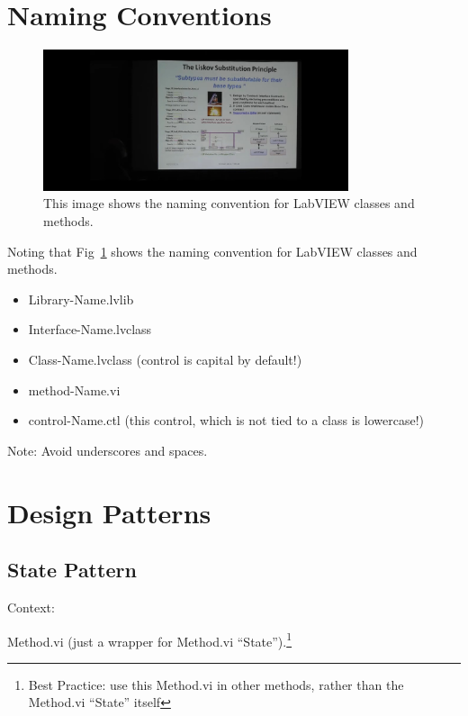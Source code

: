 \documentclass{article}
\begin{document}
\section{Naming Conventions}
\label{sec:naming-conventions}

\begin{figure}[!ht]
    \centering
    \includegraphics[width=0.8\textwidth]{figures/dmitry_liskov_sub_principle}
    \caption{This image shows the naming convention for LabVIEW classes and methods.}
    \label{fig:dmitry-liskov-sub-principle}
\end{figure}

Noting that Fig~\ref{fig:dmitry-liskov-sub-principle} shows the naming convention for LabVIEW classes and methods.
\begin{itemize}
    \item{Library-Name.lvlib}
    \item{Interface-Name.lvclass}
    \item{Class-Name.lvclass (control is capital by default!)}
    \item{method-Name.vi}
    \item{control-Name.ctl (this control, which is not tied to a class is lowercase!)}
\end{itemize}

\noindent Note: Avoid underscores and spaces.

\section{Design Patterns}
\label{sec:design-patterns}

\subsection{State Pattern}
\label{subsec:state-pattern}

\noindent Context:

\quad Method.vi (just a wrapper for Method.vi “State”).\footnote{Best Practice: use this Method.vi in other methods, rather than the Method.vi “State” itself}
\end{document}

